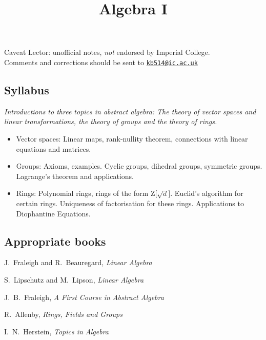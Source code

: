\documentclass[twoside]{scrartcl}
\title{Algebra I}
\begin{document}
{
Caveat Lector: unofficial notes, \emph{not} endorsed by Imperial College.\\[0.1cm]
Comments and corrections should be sent to \href{mailto:kb514@ic.ac.uk}{\texttt{kb514@ic.ac.uk}}
}
{


\subsection*{Syllabus}

\textit{Introductions to three topics in abstract algebra: The theory of vector spaces and linear
transformations, the theory of groups and the theory of rings.}


\begin{itemize}
\item Vector spaces: Linear maps, rank-nullity theorem, connections with linear equations and matrices.

\item Groups: Axioms, examples. Cyclic groups, dihedral groups, symmetric groups. Lagrange’s  theorem and applications.

\item Rings:  Polynomial rings, rings of the form Z[$\sqrt{d}$]. Euclid’s algorithm for certain rings. Uniqueness of factorisation for these rings. Applications to Diophantine Equations.
\end{itemize}

\subsection*{Appropriate books}

{\shortskip
J.~Fraleigh and R.~Beauregard, \emph{Linear Algebra}

S.~Lipschutz and M.~Lipson, \emph{Linear Algebra}

J.~B.~Fraleigh, \emph{A First Course in Abstract Algebra}

R.~Allenby, \emph{Rings, Fields and Groups}

I.~N.~Herstein, \emph{Topics in Algebra}
}}

\TableofContents

\end{document}
